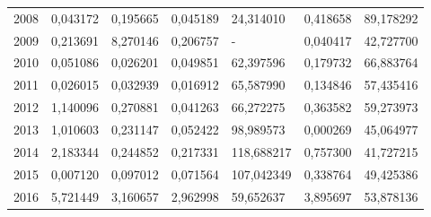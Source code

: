 \begin{table}
\begin{tabular}{p{1cm}p{2cm}p{2cm}p{2cm}p{2cm}p{2cm}p{2cm}}
 2008 &                            0,043172 &                                     0,195665 &                                      0,045189 &                           24,314010 &        0,418658 &                  89,178292 \\
 2009 &                            0,213691 &                                     8,270146 &                                      0,206757 &                                   - &        0,040417 &                  42,727700 \\
 2010 &                            0,051086 &                                     0,026201 &                                      0,049851 &                           62,397596 &        0,179732 &                  66,883764 \\
 2011 &                            0,026015 &                                     0,032939 &                                      0,016912 &                           65,587990 &        0,134846 &                  57,435416 \\
 2012 &                            1,140096 &                                     0,270881 &                                      0,041263 &                           66,272275 &        0,363582 &                  59,273973 \\
 2013 &                            1,010603 &                                     0,231147 &                                      0,052422 &                           98,989573 &        0,000269 &                  45,064977 \\
 2014 &                            2,183344 &                                     0,244852 &                                      0,217331 &                          118,688217 &        0,757300 &                  41,727215 \\
 2015 &                            0,007120 &                                     0,097012 &                                      0,071564 &                          107,042349 &        0,338764 &                  49,425386 \\
 2016 &                            5,721449 &                                     3,160657 &                                      2,962998 &                           59,652637 &        3,895697 &                  53,878136 \\
\bottomrule
\end{tabular}
\end{table}
